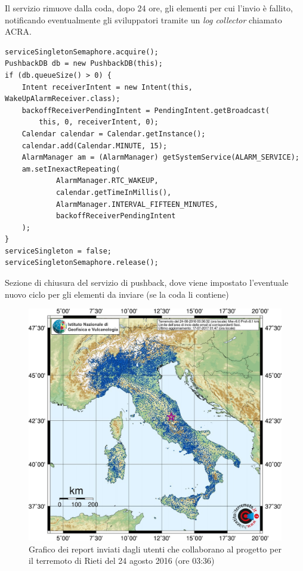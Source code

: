 \documentclass[a4paper,10pt]{memoir}
\begin{document}
Il servizio rimuove dalla coda, dopo 24 ore, gli elementi per cui l'invio è fallito, notificando eventualmente gli sviluppatori tramite un \textit{log collector} chiamato ACRA.

\begin{listing}[h]
\begin{verbatim}
serviceSingletonSemaphore.acquire();
PushbackDB db = new PushbackDB(this);
if (db.queueSize() > 0) {
	Intent receiverIntent = new Intent(this, WakeUpAlarmReceiver.class);
	backoffReceiverPendingIntent = PendingIntent.getBroadcast(
		this, 0, receiverIntent, 0);
	Calendar calendar = Calendar.getInstance();
	calendar.add(Calendar.MINUTE, 15);
	AlarmManager am = (AlarmManager) getSystemService(ALARM_SERVICE);
	am.setInexactRepeating(
			AlarmManager.RTC_WAKEUP,
			calendar.getTimeInMillis(),
			AlarmManager.INTERVAL_FIFTEEN_MINUTES,
			backoffReceiverPendingIntent
	);
}
serviceSingleton = false;
serviceSingletonSemaphore.release();
\end{verbatim}
\caption{Sezione di chiusura del servizio di pushback, dove viene impostato l'eventuale nuovo ciclo per gli elementi da inviare (se la coda li contiene)}
\label{listing:pushback}
\end{listing}

\begin{figure}[ht]
\centering
\caption{Grafico dei report inviati dagli utenti che collaborano al progetto per il terremoto di Rieti del 24 agosto 2016 (ore 03:36)}
\label{fig:hsitmap}
\includegraphics[width=\textwidth]{app/hsit_email}
\end{figure}
\end{document}
